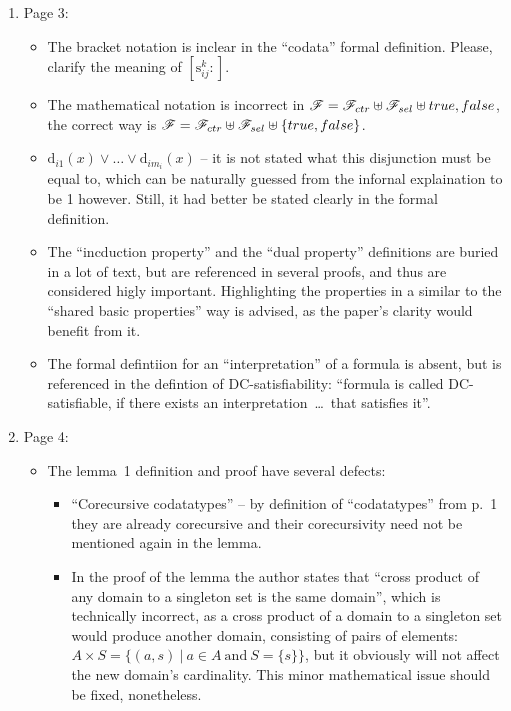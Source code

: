 \begin{enumerate}
	\item Page 3:
	\begin{itemize}
		\item The bracket notation is inclear in the ``codata'' formal definition. Please, clarify the meaning of $\left[ \mathrm{s}^{k}_{ij} : \right]$.
		\item The mathematical notation is incorrect in $\mathscr{F} = \mathscr{F}_{ctr} \uplus \mathscr{F}_{sel} \uplus true,false$, the correct way is $\mathscr{F} = \mathscr{F}_{ctr} \uplus \mathscr{F}_{sel} \uplus \{true,false\}$.
		\item $\mathrm{d}_{i1}(x) \lor \dots \lor \mathrm{d}_{im_i}(x)$ -- it is not stated what this disjunction must be equal to, which can be naturally guessed from the infornal explaination to be 1 however. Still, it had better be stated clearly in the formal definition.
		\item The ``incduction property'' and the ``dual property'' definitions are buried in a lot of text, but are referenced in several proofs, and thus are considered higly important. Highlighting the properties in a similar to the ``shared basic properties'' way is advised, as the paper's clarity would benefit from it.
		\item The formal defintiion for an ``interpretation'' of a formula is absent, but is referenced in the defintion of DC-satisfiability: ``formula is called DC-satisfiable, if there exists an interpretation~\dots~that satisfies it''.
	\end{itemize}

	\item Page 4:
	\begin{itemize}
		\item The lemma~1 definition and proof have several defects:
		\begin{itemize}
			\item ``Corecursive codatatypes'' -- by definition of ``codatatypes'' from p.~1 they are already corecursive and their corecursivity need not be mentioned again in the lemma.
			\item In the proof of the lemma the author states that ``cross product of any domain to a singleton set is the same domain'', which is technically incorrect, as a cross product of a domain to a singleton set would produce another domain, consisting of pairs of elements: $A \times S = \{ (a, s)~|~a \in A~\mathrm{and}~S = \{s\} \}$, but it obviously will not affect the new domain's cardinality. This minor mathematical issue should be fixed, nonetheless.
		\end{itemize}
	\end{itemize}


\end{enumerate}
